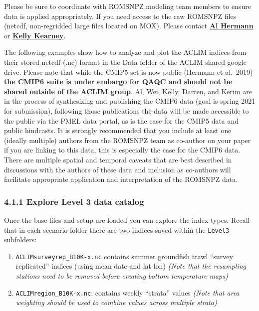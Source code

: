 \documentclass[
]{article}
\providecommand{\tightlist}{%
  \setlength{\itemsep}{0pt}\setlength{\parskip}{0pt}}
\begin{document}
Please be sure to coordinate with ROMSNPZ modeling team members to
ensure data is applied appropriately. If you need access to the raw
ROMSNPZ files (netcdf, non-regridded large files located on MOX). Please
contact \href{albert.j.hermann@noaa.gov}{\textbf{Al Hermann}} or
\href{kelly.kearney@noaa.gov}{\textbf{Kelly Kearney}}.

The following examples show how to analyze and plot the ACLIM indices
from their stored netcdf (.nc) format in the Data folder of the ACLIM
shared google drive. Please note that while the CMIP5 set is now public
(Hermann et al.~2019) \textbf{the CMIP6 suite is under embargo for QAQC
and should not be shared outside of the ACLIM group}. Al, Wei, Kelly,
Darren, and Kerim are in the process of synthesizing and publishing the
CMIP6 data (goal is spring 2021 for submission), following those
publications the data will be made accessible to the public via the PMEL
data portal, as is the case for the CMIP5 data and public hindcasts. It
is strongly recommended that you include at least one (ideally multiple)
authors from the ROMSNPZ team as co-author on your paper if you are
linking to this data, this is especially the case for the CMIP6 data.
There are multiple spatial and temporal caveats that are best described
in discussions with the authors of these data and inclusion as
co-authors will facilitate appropriate application and interpretation of
the ROMSNPZ data.

\hypertarget{explore-level-3-data-catalog}{%
\subsubsection{4.1.1 Explore Level 3 data
catalog}\label{explore-level-3-data-catalog}}

Once the base files and setup are loaded you can explore the index
types. Recall that in each scenario folder there are two indices saved
within the \texttt{Level3} subfolders:

\begin{enumerate}
\def\labelenumi{\arabic{enumi})}
\tightlist
\item
  \texttt{ACLIMsurveyrep\_B10K-x.nc} contains summer groundfish trawl
  ``survey replicated'' indices (using mean date and lat lon)
  \emph{(Note that the resampling stations need to be removed before
  creating bottom temperature maps)}\\
\item
  \texttt{ACLIMregion\_B10K-x.nc}: contains weekly ``strata'' values
  \emph{(Note that area weighting should be used to combine values
  across multiple strata)}
\end{enumerate}
\end{document}
